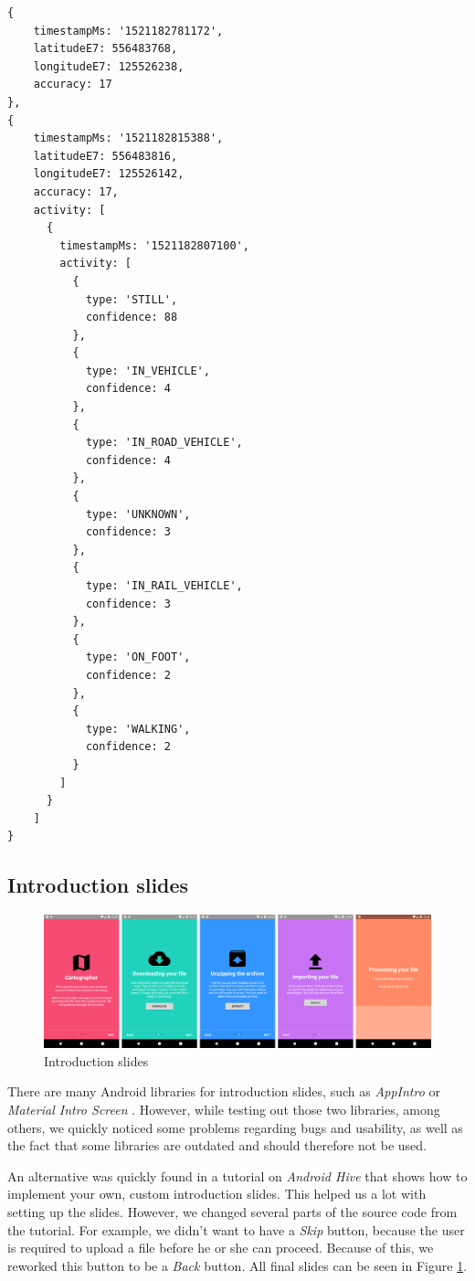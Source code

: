 \documentclass[12p]{article}
\begin{document}
    \begin{verbatim}
{
    timestampMs: '1521182781172',
    latitudeE7: 556483768,
    longitudeE7: 125526238,
    accuracy: 17
},
{
    timestampMs: '1521182815388',
    latitudeE7: 556483816,
    longitudeE7: 125526142,
    accuracy: 17,
    activity: [
      {
        timestampMs: '1521182807100',
        activity: [
          {
            type: 'STILL',
            confidence: 88
          },
          {
            type: 'IN_VEHICLE',
            confidence: 4
          },
          {
            type: 'IN_ROAD_VEHICLE',
            confidence: 4
          },
          {
            type: 'UNKNOWN',
            confidence: 3
          },
          {
            type: 'IN_RAIL_VEHICLE',
            confidence: 3
          },
          {
            type: 'ON_FOOT',
            confidence: 2
          },
          {
            type: 'WALKING',
            confidence: 2
          }
        ]
      }
    ]
}
    \end{verbatim}
    
    \subsection{Introduction slides}
    
    \begin{figure}[ht]
	    \center
        \includegraphics[width=1\textwidth]{pics/app_design/intro_slides_comp}
        \caption{Introduction slides}
        \label{fig:introduction_slides}
    \end{figure}
    
    There are many Android libraries for introduction slides, such as \textit{AppIntro} \cite{AppIntro} or \textit{Material Intro Screen} \cite{MaterialIntroScreen}. However, while testing out those two libraries, among others, we quickly noticed some problems regarding bugs and usability, as well as the fact that some libraries are outdated and should therefore not be used. 
    
    An alternative was quickly found in a tutorial on \textit{Android Hive} \cite{IntroSlidesTutorial} that shows how to implement your own, custom introduction slides. This helped us a lot with setting up the slides. However, we changed several parts of the source code from the tutorial. For example, we didn't want to have a \textit{Skip} button, because the user is required to upload a file before he or she can proceed. Because of this, we reworked this button to be a \textit{Back} button. All final slides can be seen in Figure \ref{fig:introduction_slides}.
    
\end{document}
